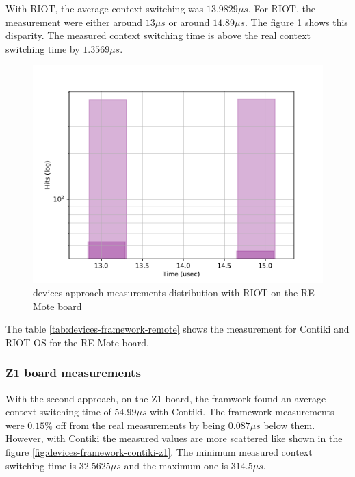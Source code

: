 With RIOT, the average context switching was $13.9829\mu s$.
For RIOT, the measurement were either around $13 \mu s$ or around $14.89 \mu s$.
The figure \ref{fig:devices-framework-riot-remote} shows this disparity.
The measured context switching time is above the real context switching time by $1.3569\mu s$.

\begin{figure}[!ht]
      \centering
      \includegraphics[scale=.7]{assets/devices-framework-riot-remote.pdf}
      \caption{devices approach measurements distribution with RIOT on the RE-Mote board\label{fig:devices-framework-riot-remote}}
\end{figure}

The table \ref{tab:devices-framework-remote} shows the measurement for Contiki and RIOT OS for the RE-Mote board.



\subsubsection{Z1 board measurements}
With the second approach, on the Z1 board, the framwork found an average context switching time of $54.99\mu s$ with Contiki.
The framework measurements were $0.15\%$ off from the real measurements by being $0.087\mu s$ below them.
However, with Contiki the measured values are more scattered like shown in the figure \ref{fig:devices-framework-contiki-z1}.
The minimum measured context switching time is $32.5625\mu s$ and the maximum one is $314.5\mu s$.

